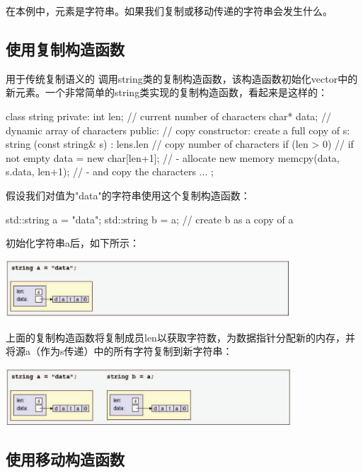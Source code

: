 在本例中，元素是字符串。如果我们复制或移动传递的字符串会发生什么。

\subsection{使用复制构造函数}

用于传统复制语义的  调用string类的复制构造函数，该构造函数初始化vector中的新元素。一个非常简单的string类实现的复制构造函数，看起来是这样的：

\begin{cppcode}
class string {
	private:
	int len; // current number of characters
	char* data; // dynamic array of characters
	public:
	// copy constructor: create a full copy of s:
	string (const string& s)
	: len{s.len} { // copy number of characters
		if (len > 0) { // if not empty
			data = new char[len+1]; // - allocate new memory
			memcpy(data, s.data, len+1); // - and copy the characters
		}
	}
	...
};
\end{cppcode}

假设我们对值为"data"的字符串使用这个复制构造函数：

\begin{cppcode}
std::string a = "data";
std::string b = a; // create b as a copy of a
\end{cppcode}

初始化字符串a后，如下所示：

\begin{center}
	\includegraphics[width=0.8\textwidth]{part1/ch1/images/18}
\end{center}

上面的复制构造函数将复制成员len以获取字符数，为数据指针分配新的内存，并将源a（作为s传递）中的所有字符复制到新字符串：

\begin{center}
	\includegraphics[width=0.8\textwidth]{part1/ch1/images/19}
\end{center}

\subsection{使用移动构造函数}

